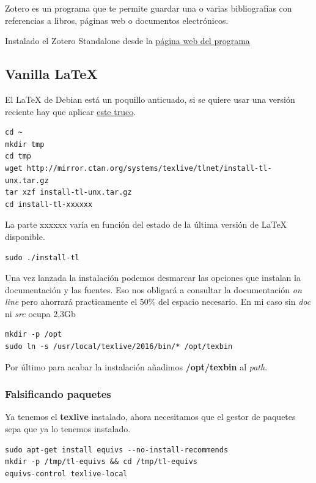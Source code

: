\documentclass[12pt,spanish,]{article}
\begin{document}
Zotero es un programa que te permite guardar una o varias bibliografías
con referencias a libros, páginas web o documentos electrónicos.

Instalado el Zotero Standalone desde la
\href{https://www.zotero.org/}{página web del programa}

\subsection{Vanilla LaTeX}\label{vanilla-latex}

El LaTeX de Debian está un poquillo anticuado, si se quiere usar una
versión reciente hay que aplicar
\href{http://tex.stackexchange.com/questions/1092/how-to-install-vanilla-texlive-on-debian-or-ubuntu}{este
truco}.

\begin{verbatim}
cd ~
mkdir tmp
cd tmp
wget http://mirror.ctan.org/systems/texlive/tlnet/install-tl-unx.tar.gz
tar xzf install-tl-unx.tar.gz
cd install-tl-xxxxxx
\end{verbatim}

La parte xxxxxx varía en función del estado de la última versión de
LaTeX disponible.

\begin{verbatim}
sudo ./install-tl
\end{verbatim}

Una vez lanzada la instalación podemos desmarcar las opciones que
instalan la documentación y las fuentes. Eso nos obligará a consultar la
documentación \emph{on line} pero ahorrará practicamente el 50\% del
espacio necesario. En mi caso sin \emph{doc} ni \emph{src} ocupa 2,3Gb

\begin{verbatim}
mkdir -p /opt
sudo ln -s /usr/local/texlive/2016/bin/* /opt/texbin
\end{verbatim}

Por último para acabar la instalación añadimos \textbf{/opt/texbin} al
\emph{path}.

\subsubsection{Falsificando paquetes}\label{falsificando-paquetes}

Ya tenemos el \textbf{texlive} instalado, ahora necesitamos que el
gestor de paquetes sepa que ya lo tenemos instalado.

\begin{verbatim}
sudo apt-get install equivs --no-install-recommends
mkdir -p /tmp/tl-equivs && cd /tmp/tl-equivs
equivs-control texlive-local
\end{verbatim}
\end{document}
